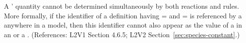 A \Species' quantity cannot be determined simultaneously by both
reactions and rules.  More formally, if the identifier of a
\Species definition having =
and = is referenced by a
\SpeciesReference anywhere in a model, then this identifier cannot
also appear as the value of a  in an
\AssignmentRule or a \RateRule.  (References: L2V1 Section 4.6.5;
L2V2 Section~\ref{sec:species-constant}.)
